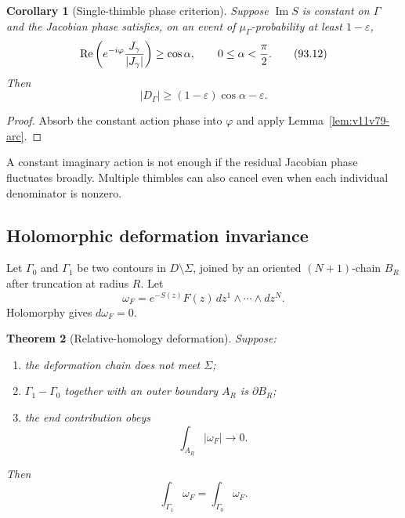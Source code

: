 \documentclass[11pt]{article}
\newtheorem{theorem}{Theorem}[section]
\newtheorem{corollary}[theorem]{Corollary}
\begin{document}
\begin{corollary}[Single-thimble phase criterion]
\label{cor:v11v93-thimble}
Suppose \(\operatorname{Im}S\) is constant on \(\Gamma\) and the
Jacobian phase satisfies, on an event of
\(\mu_\Gamma\)-probability at least \(1-\varepsilon\),
\[
 \operatorname{Re}\left(
 e^{-i\varphi}{J_\gamma\over|J_\gamma|}\right)\ge\cos\alpha,
                  \qquad 0\le\alpha<{\pi\over2}.            \tag{93.12}
\]
Then
\[
 |D_\Gamma|\ge(1-\varepsilon)\cos\alpha-\varepsilon.         \tag{93.13}
\]
\end{corollary}

\begin{proof}
Absorb the constant action phase into \(\varphi\) and apply
Lemma~\ref{lem:v11v79-arc}.
\end{proof}

A constant imaginary action is not enough if the residual Jacobian
phase fluctuates broadly.  Multiple thimbles can also cancel even
when each individual denominator is nonzero.

\subsection{Holomorphic deformation invariance}

Let \(\Gamma_0\) and \(\Gamma_1\) be two contours in
\(D\setminus\Sigma\), joined by an oriented \((N+1)\)-chain \(B_R\)
after truncation at radius \(R\).  Let
\[
                 \omega_F=e^{-S(z)}F(z)\,
                    dz^1\wedge\cdots\wedge dz^N.             \tag{93.14}
\]
Holomorphy gives \(d\omega_F=0\).

\begin{theorem}[Relative-homology deformation]
\label{thm:v11v93-deformation}
Suppose:
\begin{enumerate}
\item the deformation chain does not meet \(\Sigma\);
\item \(\Gamma_1-\Gamma_0\) together with an outer boundary
      \(A_R\) is \(\partial B_R\);
\item the end contribution obeys
\[
                              \int_{A_R}|\omega_F|\longrightarrow0.
                                                                    \tag{93.15}
\]
\end{enumerate}
Then
\[
                              \int_{\Gamma_1}\omega_F
                              =\int_{\Gamma_0}\omega_F.       \tag{93.16}
\]
\end{theorem}
\end{document}
